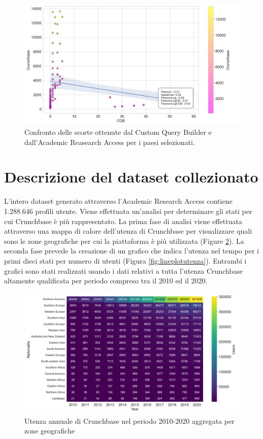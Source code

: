 \begin{figure}[t]
    \centering
    \includegraphics[width=1.0\textwidth]{images/crunchbase_academic_access/myplot.png}
    \caption{Confronto delle scorte ottenute dal Custom Query Builder e dall'Academic Reasearch Access per i paesi selezionati.}
    \label{fig:scrapervsapi}
\end{figure}


\section{Descrizione del dataset collezionato}
\label{sec:datasetcollezzionato}
L'intero dataset generato attraverso l'Academic Research Access contiene 1.288.646 profili utente.
Viene effettuata un'analisi per determinare gli stati per cui Crunchbase è più rappresentato. La prima fase di analisi viene effettuata attraverso una mappa di calore dell'utenza di Crunchbase per visualizzare quali sono le zone geografiche per cui la piattaforma è più utilizzata (Figure \ref{fig:crunchuserbaseheatmap}). La seconda fase prevede la creazione di un grafico che indica l'utenza nel tempo per i primi dieci stati per numero di utenti (Figura \ref{fig:lineplotutenza}). Entrambi i grafici sono stati realizzati usando i dati relativi a tutta l'utenza Crunchbase altamente qualificata per periodo compreso tra il 2010 ed il 2020. 
\begin{figure}[tb]
    \centering
    \includegraphics[width=\textwidth]{images/crunchbase_userbase/heatmap2.png}
    \caption{Utenza annuale di Crunchbase nel periodo 2010-2020 aggregata per zone geografiche}
    \label{fig:crunchuserbaseheatmap}
\end{figure}

